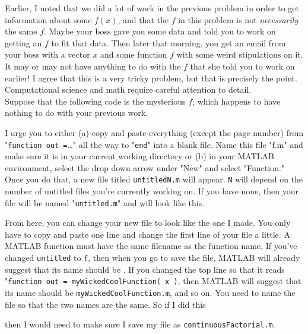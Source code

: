 \documentclass{article}
\begin{document}
Earlier, I noted that we did a lot of work in the previous problem in order to get information about some $f(x)$, and that the $f$ in this problem is not \textit{necessarily} the same $f$. Maybe your boss gave you some data and told you to work on getting an $f$ to fit that data. Then later that morning, you get an email from your boss with a vector $x$ and some function $f$ with some weird stipulations on it. It may or may not have anything to do with the $f$ that she told you to work on earlier! I agree that this is a very tricky problem, but that is precisely the point. Computational science and math require careful attention to detail.\\

Suppose that the following code is the mysterious $f$, which happens to have nothing to do with your previous work.



I urge you to either (a) copy and paste everything (except the page number) from "\texttt{function out =}\dots" all the way to "\texttt{end}" into a blank file. Name this file "f.m" and make sure it is in your current working directory or (b) in your MATLAB environment, select the drop down arrow under "New" and select "Function." Once you do that, a new file titled \texttt{untitledN.m} will appear. \texttt{N} will depend on the number of untitled files you're currently working on. If you have none, then your file will be named "\texttt{untitled.m}" and will look like this.



{\setlength{\parindent}{0cm}
From here, you can change your new file to look like the one I made. You only have to copy and paste one line and change the first line of your file a little. A MATLAB function must have the same filename as the function name. If you've changed \texttt{untitled} to \texttt{f}, then when you go to save the file, MATLAB will already suggest that its name should be . If you changed the top line so that it reads "\texttt{function out = myWickedCoolFunction( x )}, then MATLAB will suggest that its name should be \texttt{myWickedCoolFunction.m}, and so on. You need to name the file so that the two names are the same. So if I did this}



{\setlength{\parindent}{0cm}
then I would need to make sure I save my file as \texttt{continuousFactorial.m}.} \\
\end{document}
